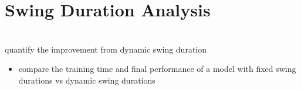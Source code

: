 \section{Swing Duration Analysis}
\label{sec:swing-duration-analysis}

\begin{todo}\\
  quantify the improvement from dynamic swing duration
  \begin{itemize}
    \item compare the training time and final performance of a model
      with fixed swing durations vs dynamic swing durations
  \end{itemize}
\end{todo}
